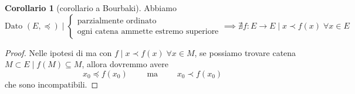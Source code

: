 \documentclass[a4paper,10pt]{article}
\theoremstyle{definition}
\theoremstyle{indentdefinition}
\theoremstyle{indentpostulate}
\theoremstyle{indenttheorem}
\newtheorem{cor}{Corollario}[section]
\theoremstyle{myremark}
\theoremstyle{indentgeneral}
\begin{document}
\begin{cor}[corollario a Bourbaki]\label{cor-bourbaki} Abbiamo
$$\text{Dato }(E,\preceq)\mid\begin{cases}
    \text{parzialmente ordinato}\\
    \text{ogni catena ammette estremo superiore}
\end{cases}\implies \nexists f:E\to E\mid x\prec f(x)\;\forall x\in E$$
\end{cor}

\begin{proof}
    Nelle ipotesi di  ma con $f\mid x\prec f(x)\;\forall x\in M$, se possiamo trovare catena $M\subset E\mid f(M)\subseteq M$, allora dovremmo avere
    $$x_0\preceq f(x_0)\qquad\text{ ma }\qquad x_0\prec f(x_0)$$
    che sono incompatibili.
\end{proof}
\end{document}
